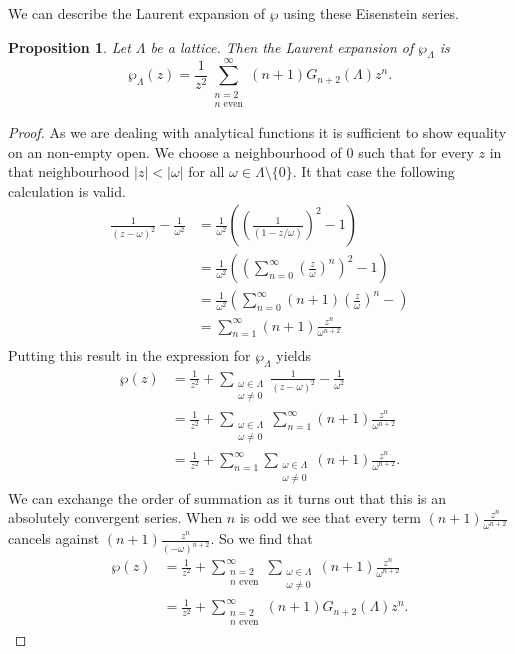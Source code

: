 \documentclass[titlepage,a4paper]{article}
\theoremstyle{theoremdd}
\newtheorem{proposition}[theorem]{Proposition}
\theoremstyle{definitiondd}
\theoremstyle{remarkdd}
\begin{document}
We can describe the Laurent expansion of $\wp$ using these Eisenstein series.
\begin{proposition}\label{prop:laurent_weierstrass}
  Let $\Lambda$ be a lattice. Then the Laurent expansion of $\wp_\Lambda$ is \[
	  \wp_\Lambda(z) = \frac{1}{z^2} \sum_{\substack{n = 2 \\ n \text{ even}}}^{\infty}(n+ 1) G_{n + 2}(\Lambda)z^{n}
  .\] 
\end{proposition}
\begin{proof}
	As we are dealing with analytical functions it is sufficient to show equality on an non-empty open. We choose a neighbourhood of 0 such that for every $z$ in that neighbourhood $|z| < |\omega|$ for all $\omega \in \Lambda \setminus \{ 0\} $. It that case the following calculation is valid. 
\begin{align*}
	\frac{1}{(z- \omega)^2} - \frac{1}{\omega^2} &= \frac{1}{\omega^2}\left( \left( \frac{1}{(1-z / \omega)} \right) ^2 - 1 \right)  \\
						     &= \frac{1}{\omega^2}\left( \left( \sum_{n = 0}^{\infty} \left(\frac{z}{\omega}\right)^{n} \right)^2 - 1  \right) \\
						     &= \frac{1}{\omega^2}\left( \sum_{n = 0}^{\infty} (n + 1)  \left( \frac{z}{\omega} \right) ^{n} - \right)  \\
						     &= \sum_{n = 1}^{\infty} (n + 1)  \frac{z^{n}}{\omega^{n+2}} \\
\end{align*}	
Putting this result in the expression for $\wp_\Lambda$ yields
\begin{align*}
	\wp(z) &= 
	\frac{1}{z^2} + \sum_{\substack{\omega \in \Lambda \\ \omega \ne 0 }} \frac{1}{(z - \omega)^2} - \frac{1}{\omega^2} \\
	       &=  \frac{1}{z^2} + \sum_{\substack{\omega \in \Lambda \\ \omega \ne 0}} \sum _{n = 1}^{\infty} (n + 1)  \frac{z^{n}}{\omega^{n+2}}\\
	       &= \frac{1}{z^2} + \sum_{n = 1}^{\infty}\sum_{\substack{\omega \in \Lambda \\ \omega \ne 0 }} (n + 1) \frac{z^{n}}{\omega^{n+2}}.
\end{align*}
We can exchange the order of summation as it turns out that this is an absolutely convergent series. 
When $n$ is odd we see that every term $ (n + 1) \frac{z^{n}}{\omega^{n+2}}$ cancels against $(n + 1) \frac{z^{n}}{(-\omega)^{n+2}}$. 
So we find that 
\begin{align*}
	\wp(z) &= \frac{1}{z^2} + \sum_{\substack{n = 2\\ n \text{ even}}}^{\infty}\sum_{\substack{\omega \in \Lambda \\ \omega \ne 0 }} (n + 1) \frac{z^{n}}{\omega^{n+2}} \\
	       &=\frac{1}{z^2} + \sum_{\substack{n = 2 \\ n \text{ even}}}^{\infty} (n+1) G_{n + 2}(\Lambda) z^{n}
.\end{align*}
\end{proof}
\end{document}
